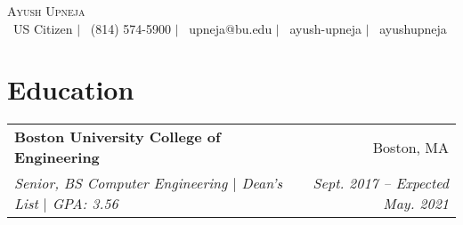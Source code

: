 \documentclass[letterpaper,11pt]{article}
\makeatletter
\newcommand{\resumeSubheading}[4]{
  \vspace{-1pt}\item[]
    \begin{tabular*}{0.97\textwidth}{l@{\extracolsep{\fill}}r}
      \textbf{#1} & #2 \\
      \textit{\small#3} & \textit{\small #4} \\
    \end{tabular*}\vspace{-5pt}
}
\makeatother
\begin{document}
\vspace*{-10pt}
\begin{center}
	{\Huge \scshape {Ayush Upneja}}\\
    \faGlobe \ US Citizen $|$ \faPhone \ (814) 574-5900 $|$ \faEnvelope \ upneja@bu.edu $|$ \faLinkedinSquare \ ayush-upneja $|$ \faGithub \ ayushupneja \\
\end{center}
\vspace{-6mm}
\section{Education}

    \resumeSubheading
      {Boston University College of Engineering}{Boston, MA}
      {Senior, BS Computer Engineering $|$ Dean's List $|$ \textit{GPA: 3.56}}{Sept. 2017 -- Expected May. 2021}
  
  
\setlength{\itemindent}{5mm}
\vspace{-1mm}
\end{document}

